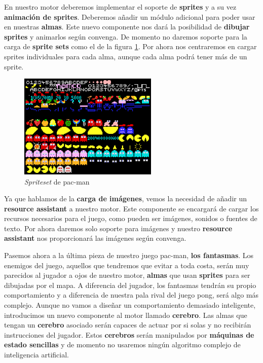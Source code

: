 \documentclass[a4paper]{article}
\begin{document}
En nuestro motor deberemos implementar el soporte de \textbf{sprites} y a su vez \textbf{animación de sprites}. Deberemos añadir un módulo adicional para poder usar en nuestras \textbf{almas}. Este nuevo componente nos dará la posibilidad de \textbf{dibujar sprites} y animarlos según convenga. De momento no daremos soporte para la carga de \textbf{sprite sets} como el de la figura \ref{pacman_spriteset}. Por ahora nos centraremos en cargar sprites individuales para cada alma, aunque cada alma podrá tener más de un sprite.

\begin{figure}[h]
  \begin{center}
    \includegraphics[width=250px]{images/pacman_spriteset.png}
    \caption{\textit{Spriteset} de pac-man}
    \label{pacman_spriteset}
  \end{center}
\end{figure}

Ya que hablamos de la \textbf{carga de imágenes}, vemos la necesidad de añadir un \textbf{resource assistant} a nuestro motor. Este componente se encargará de cargar los recursos necesarios para el juego, como pueden ser imágenes, sonidos o fuentes de texto. Por ahora daremos solo soporte para imágenes y nuestro \textbf{resource assistant} nos proporcionará las imágenes según convenga.

Pasemos ahora a la última pieza de nuestro juego pac-man, \textbf{los fantasmas}. Los enemigos del juego, aquellos que tendremos que evitar a toda costa, serán muy parecidos al jugador a ojos de nuestro motor, \textbf{almas} que usan \textbf{sprites} para ser dibujadas por el mapa. A diferencia del jugador, los fantasmas tendrán su propio comportamiento y a diferencia de nuestra pala rival del juego pong, será algo más complejo. Aunque no vamos a diseñar un comportamiento demasiado inteligente, introducimos un nuevo componente al motor llamado \textbf{cerebro}. Las almas que tengan un \textbf{cerebro} asociado serán capaces de actuar por si solas y no recibirán instrucciones del jugador. Estos \textbf{cerebros} serán manipulados por \textbf{máquinas de estado sencillas} y de momento no usaremos ningún algoritmo complejo de inteligencia artificial.
\end{document}

